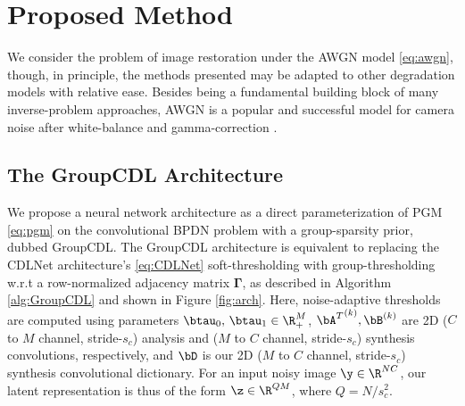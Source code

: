 \documentclass[lettersize,journal]{IEEEtran}
\newcommand{\ADJMAT}{\boldsymbol{\Gamma}}
\begin{document}
\section{Proposed Method} \label{sec:method}
We consider the problem of image restoration under the AWGN model
\eqref{eq:awgn}, though, in principle, the methods presented may be adapted to
other degradation models with relative ease. Besides being a fundamental building
block of many inverse-problem approaches, AWGN is a popular and successful model
for camera noise after white-balance and gamma-correction \cite{Khashabi2014}. 

\subsection{The GroupCDL Architecture}
We propose a neural network architecture as a direct parameterization of
PGM \eqref{eq:pgm} on the convolutional BPDN problem with a group-sparsity prior, dubbed GroupCDL. 
The GroupCDL architecture is equivalent to replacing the CDLNet
\cite{janjusevicCDLNet2022} architecture's \eqref{eq:CDLNet}
soft-thresholding with group-thresholding w.r.t a row-normalized
adjacency matrix $\ADJMAT$, as described in Algorithm \ref{alg:GroupCDL} and shown in Figure \ref{fig:arch}.
Here, noise-adaptive thresholds are computed using parameters $\btau_0,\, \btau_1 \in \R^M_+$,
${\bA^T}^{(k)}, \bB^{(k)}$ are 2D ($C$ to $M$ channel, stride-$s_c$) analysis and ($M$ to $C$
channel, stride-$s_c$) synthesis convolutions,
respectively, and $\bD$ is our 2D ($M$ to $C$ channel, stride-$s_c$) synthesis
convolutional dictionary. For an input noisy image $\y \in \R^{NC}$, our latent
representation is thus of the form $\z \in \R^{QM}$, where {$Q=N/s_c^2$}.
\end{document}
